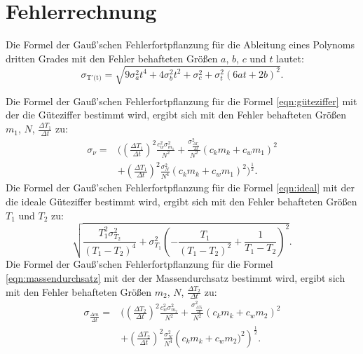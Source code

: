 \section{Fehlerrechnung}

Die Formel der Gauß'schen Fehlerfortpflanzung für die Ableitung eines Polynoms dritten Grades mit den Fehler behafteten Größen 
 $a$, $b$, $c$ und $t$ lautet:
\begin{equation}
    \sigma_\text{T'(t)} = \sqrt{9 \sigma_{a}^{2} t^{4} + 4 \sigma_{b}^{2} t^{2} + \sigma_{c}^{2} + \sigma_{t}^{2} \left(6 a t + 2 b\right)^{2}}.
    \label{eqn:pol3}
\end{equation}

Die Formel der Gauß'schen Fehlerfortpflanzung für die Formel \ref{eqn:güteziffer} mit der die Güteziffer bestimmt wird, ergibt sich mit den Fehler behafteten Größen 
$m_1$, $N$, $\frac{\Delta T_1}{\Delta t}$ zu:
\begin{equation}
    \begin{split}
        \sigma_{\nu} = {} &\Biggl(\left(\frac{\Delta T_1}{\Delta t}\right)^{2}\frac{c_{w}^{2} \sigma_{m_{1}}^{2}}{N^{2}}  
    + \frac{\sigma_{\frac{\Delta T_1}{\Delta t}}^{2}}{N^{2}} \left(c_{k} m_{k} + c_{w} m_{1}\right)^{2}  \\
    &+\left(\frac{\Delta T_1}{\Delta t}\right)^{2} \frac{\sigma_{N}^{2}}{N^{4}} \left(c_{k} m_{k} + c_{w} m_{1}\right)^{2}\Biggr)^{\frac{1}{2}}.
    \end{split}
\label{eq:gütefehler}
\end{equation}
Die Formel der Gauß'schen Fehlerfortpflanzung für die Formel \ref{eqn:ideal} mit der die ideale Güteziffer bestimmt wird, ergibt sich mit den Fehler behafteten Größen 
$T_1$ und $T_2$ zu:
\begin{equation}
\sqrt{\frac{T_{1}^{2} \sigma_{T_{2}}^{2}}{\left(T_{1} - T_{2}\right)^{4}} + \sigma_{T_{1}}^{2} \left(- \frac{T_{1}}{\left(T_{1} - T_{2}\right)^{2}} + \frac{1}{T_{1} - T_{2}}\right)^{2}}.
    \label{eq:idealFehler}
\end{equation}
Die Formel der Gauß'schen Fehlerfortpflanzung für die Formel \ref{eqn:massendurchsatz} mit der der Massendurchsatz bestimmt wird, ergibt sich mit den Fehler behafteten Größen 
$m_2$, $N$, $\frac{\Delta T_2}{\Delta t}$ zu:
\begin{equation}
    \begin{split}
        \sigma_{\frac{\Delta m}{\Delta t}} = {} & \Biggl(\left(\frac{\Delta T_2}{\Delta t}\right)^{2}\frac{c_{w}^{2} \sigma_{m_{2}}^{2}}{N^{2}} 
    + \frac{\sigma_{\frac{\Delta T_2}{\Delta t}}^{2}}{N^{2}} \left(c_{k} m_{k} + c_{w} m_{2}\right)^{2} \\ 
    &    +\left(\frac{\Delta T_2}{\Delta t}\right)^{2} \frac{\sigma_{N}^{2}}{N^{4}} \left(c_{k} m_{k} + c_{w} m_{2}\Biggr)^{2}\right)^{\frac{1}{2}}.
    \end{split}
    \label{eq:massendurchsatzFehler}
\end{equation}

